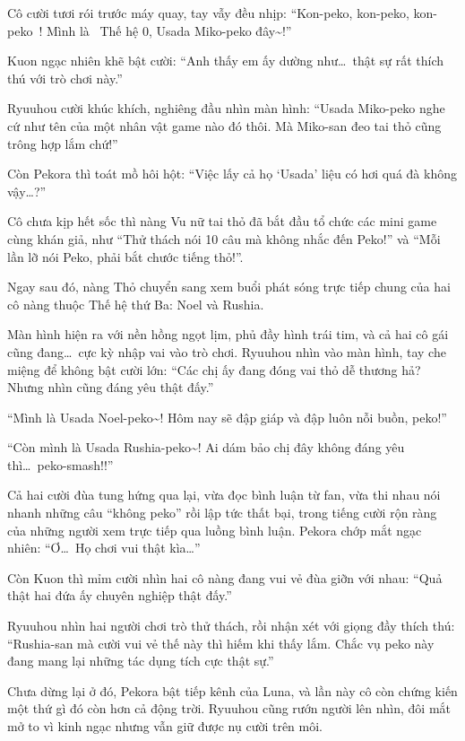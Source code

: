\documentclass[../main.tex]{subfiles}
\begin{document}
Cô cười tươi rói trước máy quay, tay vẫy đều nhịp: ``Kon-peko, kon-peko, kon-peko~! Mình là \hll\ Thế hệ 0, Usada Miko-peko đây\~{}!''

Kuon ngạc nhiên khẽ bật cười: ``Anh thấy em ấy dường như\dots\ thật sự rất thích thú với trò chơi này.''

Ryuuhou cười khúc khích, nghiêng đầu nhìn màn hình: ``Usada Miko-peko nghe cứ như tên của một nhân vật game nào đó thôi. Mà Miko-san đeo tai thỏ cũng trông hợp lắm chứ!''

Còn Pekora thì toát mồ hôi hột: ``Việc lấy cả họ `Usada' liệu có hơi quá đà không vậy\dots?''

Cô chưa kịp hết sốc thì nàng Vu nữ tai thỏ đã bắt đầu tổ chức các mini game cùng khán giả, như ``Thử thách nói 10 câu mà không nhắc đến Peko!'' và ``Mỗi lần lỡ nói Peko, phải bắt chước tiếng thỏ!''.

Ngay sau đó, nàng Thỏ chuyển sang xem buổi phát sóng trực tiếp chung của hai cô nàng thuộc Thế hệ thứ Ba: Noel và Rushia.

Màn hình hiện ra với nền hồng ngọt lịm, phủ đầy hình trái tim, và cả hai cô gái cũng đang\dots\ cực kỳ nhập vai vào trò chơi. Ryuuhou nhìn vào màn hình, tay che miệng để không bật cười lớn: ``Các chị ấy đang đóng vai thỏ dễ thương hả? Nhưng nhìn cũng đáng yêu thật đấy.''

``Mình là Usada Noel-peko\~{}! Hôm nay sẽ đập giáp và đập luôn nỗi buồn, peko!''

``Còn mình là Usada Rushia-peko\~{}! Ai dám bảo chị đây không đáng yêu thì\dots\ peko-smash!!''


Cả hai cười đùa tung hứng qua lại, vừa đọc bình luận từ fan, vừa thi nhau nói nhanh những câu ``không peko'' rồi lập tức thất bại, trong tiếng cười rộn ràng của những người xem trực tiếp qua luồng bình luận. Pekora chớp mắt ngạc nhiên: ``Ơ\dots\ Họ chơi vui thật kìa\dots''

Còn Kuon thì mỉm cười nhìn hai cô nàng đang vui vẻ đùa giỡn với nhau: ``Quả thật hai đứa ấy chuyên nghiệp thật đấy.''

Ryuuhou nhìn hai người chơi trò thử thách, rồi nhận xét với giọng đầy thích thú: ``Rushia-san mà cười vui vẻ thế này thì hiếm khi thấy lắm. Chắc vụ peko này đang mang lại những tác dụng tích cực thật sự.''

Chưa dừng lại ở đó, Pekora bật tiếp kênh của Luna, và lần này cô còn chứng kiến một thứ gì đó còn hơn cả động trời. Ryuuhou cũng rướn người lên nhìn, đôi mắt mở to vì kinh ngạc nhưng vẫn giữ được nụ cười trên môi.
\end{document}
